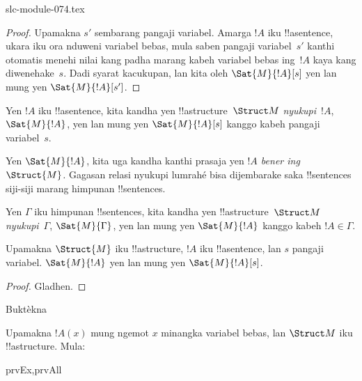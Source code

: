 \begin{filecontents*}[overwrite]{slc-module-074.tex}
\begin{proof}
  Upamakna $s'$ sembarang pangaji variabel. Amarga $!A$ iku
  !!a{sentence}, ukara iku ora nduweni variabel bebas,
  mula saben pangaji variabel~$s'$ kanthi otomatis menehi
  nilai kang padha marang kabeh variabel bebas ing~$!A$
  kaya kang diwenehake~$s$. Dadi syarat
   kacukupan, lan kita oleh
  $\Sat{M}{!A}[s]$ yen lan mung yen $\Sat{M}{!A}[s']$.
\end{proof}

\begin{defn}
Yen $!A$ iku !!a{sentence}, kita kandha yen
!!a{structure}~$\Struct M$ \emph{nyukupi}~$!A$,
$\Sat{M}{!A}$, yen lan mung yen $\Sat{M}{!A}[s]$
kanggo kabeh pangaji variabel~$s$.
\end{defn}

Yen $\Sat{M}{!A}$, kita uga kandha kanthi prasaja yen
\emph{$!A$ bener ing~$\Struct{M}$.} Gagasan relasi nyukupi
lumrahé bisa dijembarake saka !!{sentence}s siji-siji
marang himpunan !!{sentence}s.

\begin{defn}
Yen $\Gamma$ iku himpunan !!{sentence}s, kita
kandha yen !!a{structure}~$\Struct M$ \emph{nyukupi}~$\Gamma$,
$\Sat{M}{\Gamma}$, yen lan mung yen $\Sat{M}{!A}$
kanggo kabeh $!A \in \Gamma$.
\end{defn}

\begin{prop}
  Upamakna $\Struct{M}$ iku !!a{structure}, $!A$ iku
  !!a{sentence}, lan $s$ pangaji variabel.
  $\Sat{M}{!A}$ yen lan mung yen $\Sat{M}{!A}[s]$.
\end{prop}

\begin{proof}
Gladhen.
\end{proof}

\begin{prob}
Buktèkna 
\end{prob}

\begin{prop}
  Upamakna $!A(x)$ mung ngemot $x$ minangka variabel bebas,
  lan $\Struct M$ iku !!a{structure}. Mula:
  \begin{tagenumerate}{prvEx,prvAll}
\end{tagenumerate}
\end{prop}


\end{filecontents*}
